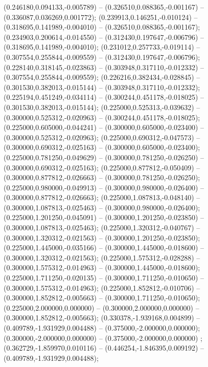  (0.246180,0.094133,-0.005789) -- (0.326510,0.088365,-0.001167) -- (0.336087,0.036269,0.001772);
 (0.239913,0.146251,-0.010124) -- (0.318695,0.141989,-0.004010) -- (0.326510,0.088365,-0.001167);
 (0.234903,0.200614,-0.014550) -- (0.312430,0.197647,-0.006796) -- (0.318695,0.141989,-0.004010);
 (0.231012,0.257733,-0.019114) -- (0.307554,0.255844,-0.009559) -- (0.312430,0.197647,-0.006796);
 (0.228140,0.318145,-0.023863) -- (0.303948,0.317110,-0.012332) -- (0.307554,0.255844,-0.009559);
 (0.226216,0.382434,-0.028845) -- (0.301530,0.382013,-0.015144) -- (0.303948,0.317110,-0.012332);
 (0.225194,0.451249,-0.034114) -- (0.300244,0.451178,-0.018025) -- (0.301530,0.382013,-0.015144);
 (0.225000,0.525313,-0.039632) -- (0.300000,0.525312,-0.020963) -- (0.300244,0.451178,-0.018025);
 (0.225000,0.605000,-0.044241) -- (0.300000,0.605000,-0.023400) -- (0.300000,0.525312,-0.020963);
 (0.225000,0.690312,-0.047573) -- (0.300000,0.690312,-0.025163) -- (0.300000,0.605000,-0.023400);
 (0.225000,0.781250,-0.049629) -- (0.300000,0.781250,-0.026250) -- (0.300000,0.690312,-0.025163);
 (0.225000,0.877812,-0.050409) -- (0.300000,0.877812,-0.026663) -- (0.300000,0.781250,-0.026250);
 (0.225000,0.980000,-0.049913) -- (0.300000,0.980000,-0.026400) -- (0.300000,0.877812,-0.026663);
 (0.225000,1.087813,-0.048140) -- (0.300000,1.087813,-0.025463) -- (0.300000,0.980000,-0.026400);
 (0.225000,1.201250,-0.045091) -- (0.300000,1.201250,-0.023850) -- (0.300000,1.087813,-0.025463);
 (0.225000,1.320312,-0.040767) -- (0.300000,1.320312,-0.021563) -- (0.300000,1.201250,-0.023850);
 (0.225000,1.445000,-0.035166) -- (0.300000,1.445000,-0.018600) -- (0.300000,1.320312,-0.021563);
 (0.225000,1.575312,-0.028288) -- (0.300000,1.575312,-0.014963) -- (0.300000,1.445000,-0.018600);
 (0.225000,1.711250,-0.020135) -- (0.300000,1.711250,-0.010650) -- (0.300000,1.575312,-0.014963);
 (0.225000,1.852812,-0.010706) -- (0.300000,1.852812,-0.005663) -- (0.300000,1.711250,-0.010650);
 (0.225000,2.000000,0.000000) -- (0.300000,2.000000,0.000000) -- (0.300000,1.852812,-0.005663);
 (0.330378,-1.939168,0.004899) -- (0.409789,-1.931929,0.004488) -- (0.375000,-2.000000,0.000000);
 (0.300000,-2.000000,0.000000) -- (0.375000,-2.000000,0.000000) ;
 (0.362729,-1.859970,0.010116) -- (0.446254,-1.846395,0.009192) -- (0.409789,-1.931929,0.004488);
